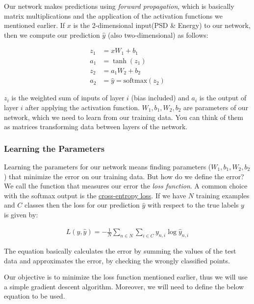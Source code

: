 \documentclass[11pt]{article}
\begin{document}
Our network makes predictions using \emph{forward propagation}, which is
basically matrix multiplications and the application of the activation
functions we mentioned earlier. If \(x\) is the 2-dimensional input(PSD
\& Energy) to our network, then we compute our prediction \(\hat{y}\)
(also two-dimensional) as follows:

    \[
\begin{aligned}
z_1 & = xW_1 + b_1 \\
a_1 & = \tanh(z_1) \\
z_2 & = a_1W_2 + b_2 \\
a_2 & = \hat{y} = \mathrm{softmax}(z_2)
\end{aligned}
\]

    \(z_i\) is the weighted sum of inputs of layer \(i\) (bias included) and
\(a_i\) is the output of layer \(i\) after applying the activation
function. \(W_1, b_1, W_2, b_2\) are parameters of our network, which we
need to learn from our training data. You can think of them as matrices
transforming data between layers of the network.

    \hypertarget{learning-the-parameters}{%
\subsubsection{Learning the Parameters}\label{learning-the-parameters}}

Learning the parameters for our network means finding parameters
(\(W_1, b_1, W_2, b_2\)) that minimize the error on our training data.
But how do we define the error? We call the function that measures our
error the \emph{loss function}. A common choice with the softmax output
is the
\href{https://en.wikipedia.org/wiki/Cross_entropy\#Cross-entropy_error_function_and_logistic_regression}{cross-entropy
loss}. If we have \(N\) training examples and \(C\) classes then the
loss for our prediction \(\hat{y}\) with respect to the true labels
\(y\) is given by:

\[
\begin{aligned}
L(y,\hat{y}) = - \frac{1}{N} \sum_{n \in N} \sum_{i \in C} y_{n,i} \log\hat{y}_{n,i}
\end{aligned}
\]

    The equation basically calculates the error by summing the values of the
test data and approximates the error, by checking the wrongly classified
points.

    Our objective is to minimize the loss function mentioned earlier, thus
we will use a simple gradient descent algorithm. Moreover, we will need
to define the below equation to be used.
\end{document}

